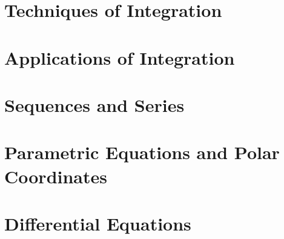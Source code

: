 \documentclass[12pt]{article}
\begin{document}
\section{Techniques of Integration}





\section{Applications of Integration}




\section{Sequences and Series}






\section{Parametric Equations and Polar Coordinates}



\section{Differential Equations}




\end{document}
